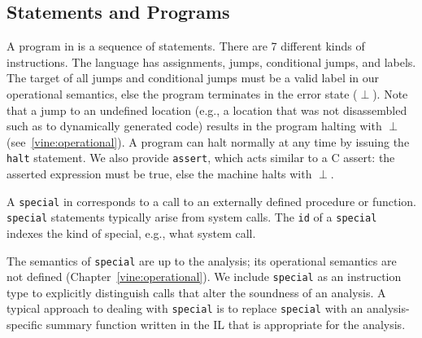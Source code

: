 \subsection{Statements and Programs}

A program in \bil is a sequence of statements.  There are 7 different
kinds of instructions. The language has assignments, jumps,
conditional jumps, and labels.  The target of all jumps and
conditional jumps must be a valid label in our operational semantics,
else the program terminates in the error state ($\perp$).  Note that a
jump to an undefined location (e.g., a location that was not
disassembled such as to dynamically generated code) results in the
\bap program halting with $\perp$ (see~\ref{vine:operational}). A
program can halt normally at any time by issuing the {\tt halt}
statement.  We also provide {\tt assert}, which acts similar to a C
assert: the asserted expression must be true, else the machine halts
with $\perp$.

A {\tt special} in \bil corresponds to a call to an externally
defined procedure or function. {\tt special} statements typically
arise from system calls.  The {\tt id} of a {\tt special} indexes the
kind of special, e.g., what system call.

The semantics of {\tt special} are up to the analysis; its operational
semantics are not defined (Chapter~\ref{vine:operational}).  We
include {\tt special} as an instruction type to explicitly distinguish
calls that alter the soundness of an analysis. A typical approach to
dealing with {\tt special} is to replace {\tt special} with an
analysis-specific summary function written in the \bap IL that is
appropriate for the analysis.


